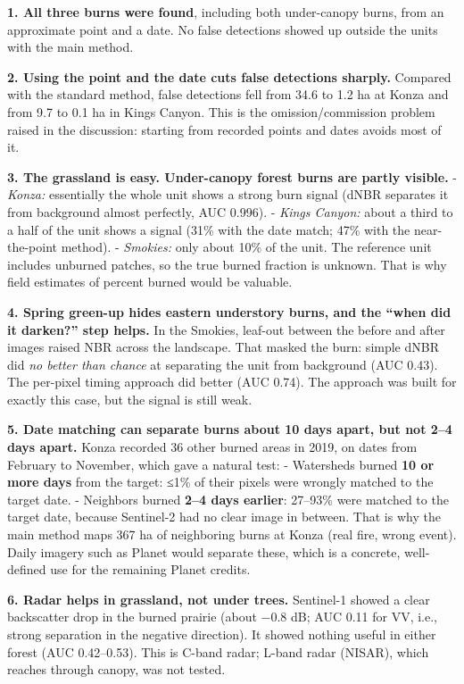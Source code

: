 \documentclass[
]{article}
\begin{document}
\textbf{1. All three burns were found}, including both under-canopy
burns, from an approximate point and a date. No false detections showed
up outside the units with the main method.

\textbf{2. Using the point and the date cuts false detections sharply.}
Compared with the standard method, false detections fell from 34.6 to
1.2 ha at Konza and from 9.7 to 0.1 ha in Kings Canyon. This is the
omission/commission problem raised in the discussion: starting from
recorded points and dates avoids most of it.

\textbf{3. The grassland is easy. Under-canopy forest burns are partly
visible.} - \emph{Konza:} essentially the whole unit shows a strong burn
signal (dNBR separates it from background almost perfectly, AUC 0.996).
- \emph{Kings Canyon:} about a third to a half of the unit shows a
signal (31\% with the date match; 47\% with the near-the-point method).
- \emph{Smokies:} only about 10\% of the unit. The reference unit
includes unburned patches, so the true burned fraction is unknown. That
is why field estimates of percent burned would be valuable.

\textbf{4. Spring green-up hides eastern understory burns, and the
``when did it darken?'' step helps.} In the Smokies, leaf-out between
the before and after images raised NBR across the landscape. That masked
the burn: simple dNBR did \emph{no better than chance} at separating the
unit from background (AUC 0.43). The per-pixel timing approach did
better (AUC 0.74). The approach was built for exactly this case, but the
signal is still weak.

\textbf{5. Date matching can separate burns about 10 days apart, but not
2--4 days apart.} Konza recorded 36 other burned areas in 2019, on dates
from February to November, which gave a natural test: - Watersheds
burned \textbf{10 or more days} from the target: ≤1\% of their pixels
were wrongly matched to the target date. - Neighbors burned \textbf{2--4
days earlier}: 27--93\% were matched to the target date, because
Sentinel-2 had no clear image in between. That is why the main method
maps 367 ha of neighboring burns at Konza (real fire, wrong event).
Daily imagery such as Planet would separate these, which is a concrete,
well-defined use for the remaining Planet credits.

\textbf{6. Radar helps in grassland, not under trees.} Sentinel-1 showed
a clear backscatter drop in the burned prairie (about −0.8 dB; AUC 0.11
for VV, i.e., strong separation in the negative direction). It showed
nothing useful in either forest (AUC 0.42--0.53). This is C-band radar;
L-band radar (NISAR), which reaches through canopy, was not tested.
\end{document}
